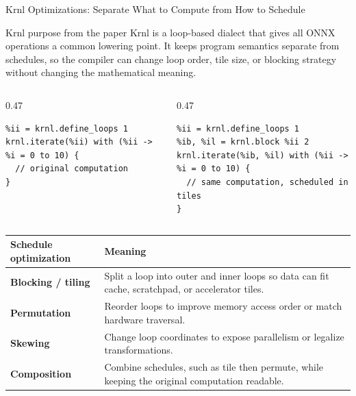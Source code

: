 \documentclass[aspectratio=169,10pt]{beamer}
\newcommand{\edgeword}[1]{\textcolor{red!75!black}{\textbf{#1}}}
\begin{document}
\begin{frame}[fragile]{Krnl Optimizations: Separate What to Compute from How to Schedule}
  \scriptsize
  \begin{block}{Krnl purpose from the paper}
    Krnl is a loop-based dialect that gives all ONNX operations a common lowering point. It keeps program semantics separate from schedules, so the compiler can change loop order, tile size, or blocking strategy without changing the mathematical meaning.
  \end{block}

  \vspace{0.3em}
  \begin{columns}[T,onlytextwidth]
    \begin{column}{0.47\textwidth}
\begin{lstlisting}
%ii = krnl.define_loops 1
krnl.iterate(%ii) with (%ii -> %i = 0 to 10) {
  // original computation
}
\end{lstlisting}
    \end{column}
    \begin{column}{0.47\textwidth}
\begin{lstlisting}
%ii = krnl.define_loops 1
%ib, %il = krnl.block %ii 2
krnl.iterate(%ib, %il) with (%ii -> %i = 0 to 10) {
  // same computation, scheduled in tiles
}
\end{lstlisting}
    \end{column}
  \end{columns}

  \vspace{0.4em}
  \begin{tabularx}{\textwidth}{@{}lX@{}}
    \toprule
    Schedule optimization & Meaning \\
    \midrule
    \edgeword{Blocking / tiling} & Split a loop into outer and inner loops so data can fit cache, scratchpad, or accelerator tiles. \\
    \edgeword{Permutation} & Reorder loops to improve memory access order or match hardware traversal. \\
    \edgeword{Skewing} & Change loop coordinates to expose parallelism or legalize transformations. \\
    \edgeword{Composition} & Combine schedules, such as tile then permute, while keeping the original computation readable. \\
    \bottomrule
  \end{tabularx}
\end{frame}
\end{document}
